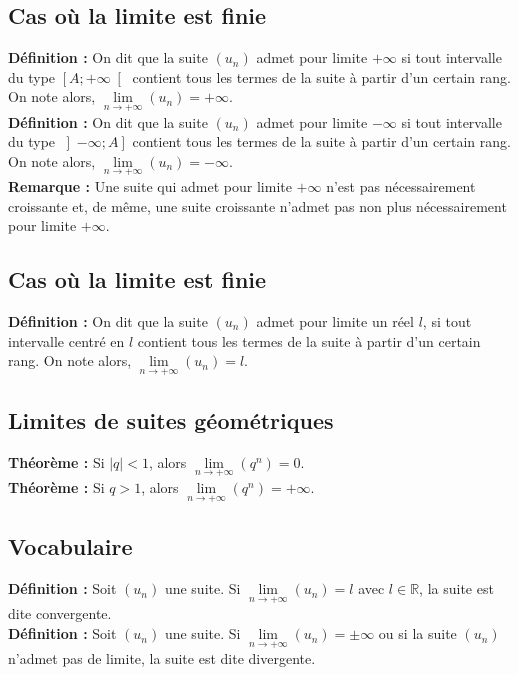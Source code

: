 \documentclass[a4paper,titlepage]{article}
\begin{document}
    \subsection{Cas où la limite est finie}
        \textbf{Définition :} On dit que la suite $\left(u_{n}\right)$ admet pour limite $+\infty$ si tout intervalle du type $\left[A;+\infty\right[$ contient tous les termes de la suite à partir d’un certain rang. On note alors, $\lim\limits_{n\to+\infty}\left(u_{n}\right)=+\infty$.
        \\
        \textbf{Définition :} On dit que la suite $\left(u_{n}\right)$ admet pour limite $-\infty$ si tout intervalle du type $\left]-\infty;A\right]$ contient tous les termes de la suite à partir d’un certain rang. On note alors, $\lim\limits_{n\to+\infty}\left(u_{n}\right)=-\infty$.
        \\
        \textbf{Remarque :} Une suite qui admet pour limite $+\infty$ n’est pas nécessairement croissante et, de même, une suite croissante n’admet pas non plus nécessairement pour limite $+\infty$.
    \subsection{Cas où la limite est finie}
        \textbf{Définition :} On dit que la suite $\left(u_{n}\right)$ admet pour limite un réel $l$, si tout intervalle centré en $l$ contient tous les termes de la suite à partir d’un certain rang. On note alors, $\lim\limits_{n\to+\infty}\left(u_{n}\right)=l$.
    \subsection{Limites de suites géométriques}
        \textbf{Théorème :} Si $\left|q\right|<1$, alors $\lim\limits_{n\to+\infty}\left(q^{n}\right)=0$.
        \\
        \textbf{Théorème :} Si $q>1$, alors $\lim\limits_{n\to+\infty}\left(q^{n}\right)=+\infty$.
    \subsection{Vocabulaire}
        \textbf{Définition :} Soit $\left(u_{n}\right)$ une suite. Si $\lim\limits_{n\to+\infty}\left(u_{n}\right)=l$ avec $l\in\mathbb{R}$, la suite est dite convergente.
        \\
        \textbf{Définition :} Soit $\left(u_{n}\right)$ une suite. Si $\lim\limits_{n\to+\infty}\left(u_{n}\right)=\pm\infty$ ou si la suite $\left(u_{n}\right)$ n’admet pas de limite, la suite est dite divergente.
\end{document}
